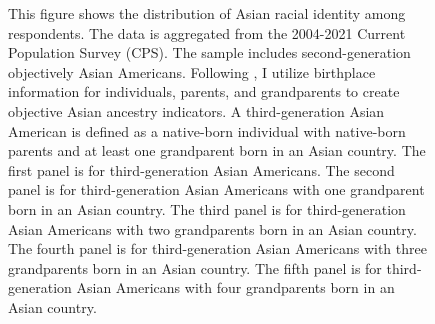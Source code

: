 \begin{landscape}
\begin{figure}[!htb]
\caption*{\footnotesize{This figure shows the distribution of Asian racial identity among respondents. 
The data is aggregated from the 2004-2021 Current Population Survey (CPS). 
The sample includes second-generation objectively Asian Americans.
Following \textcite{antmanEthnicAttritionObserved2016,antmanEthnicAttritionAssimilation2020}, 
I utilize birthplace information for individuals, parents, and grandparents to create objective Asian ancestry indicators.
A third-generation Asian American is defined as a native-born individual with native-born parents and at least one grandparent born in an Asian country. 
The first panel is for third-generation Asian Americans. The second panel is for third-generation Asian Americans with one grandparent born in an Asian country. 
The third panel is for third-generation Asian Americans with two grandparents born in an Asian country. 
The fourth panel is for third-generation Asian Americans with three grandparents born in an Asian country.
The fifth panel is for third-generation Asian Americans with four grandparents born in an Asian country.
}}
\end{figure}
\end{landscape}

\pagebreak
\newpage

